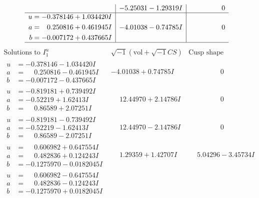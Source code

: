 \documentclass[1p]{elsarticle_modified}
\theoremstyle{definition}
\newcommand{\I}{\sqrt{-1}}
\begin{document}
$$\begin{array}{c|c|c}
 & -5.25031 - 1.29319 I & \phantom{-0.000000 } 0 \\ \hline\begin{aligned}
u &= -0.378146 + 1.034420 I \\
a &= \phantom{-}0.250816 + 0.461945 I \\
b &= -0.007172 + 0.437665 I\end{aligned}
 & -4.01038 - 0.74785 I & \phantom{-0.000000 } 0\\
 \hline 
 \end{array}$$\newpage$$\begin{array}{c|c|c}  
\text{Solutions to }I^u_{1}& \I (\text{vol} + \sqrt{-1}CS) & \text{Cusp shape}\\
 \hline 
\begin{aligned}
u &= -0.378146 - 1.034420 I \\
a &= \phantom{-}0.250816 - 0.461945 I \\
b &= -0.007172 - 0.437665 I\end{aligned}
 & -4.01038 + 0.74785 I & \phantom{-0.000000 } 0 \\ \hline\begin{aligned}
u &= -0.819181 + 0.739492 I \\
a &= -0.52219 + 1.62413 I \\
b &= \phantom{-}0.86589 + 2.07251 I\end{aligned}
 & \phantom{-}12.44970 + 2.14786 I & \phantom{-0.000000 } 0 \\ \hline\begin{aligned}
u &= -0.819181 - 0.739492 I \\
a &= -0.52219 - 1.62413 I \\
b &= \phantom{-}0.86589 - 2.07251 I\end{aligned}
 & \phantom{-}12.44970 - 2.14786 I & \phantom{-0.000000 } 0 \\ \hline\begin{aligned}
u &= \phantom{-}0.606982 + 0.647554 I \\
a &= \phantom{-}0.482836 + 0.124243 I \\
b &= -0.1275970 - 0.0182045 I\end{aligned}
 & \phantom{-}1.29359 + 1.42707 I & \phantom{-}5.04296 - 3.45734 I \\ \hline\begin{aligned}
u &= \phantom{-}0.606982 - 0.647554 I \\
a &= \phantom{-}0.482836 - 0.124243 I \\
b &= -0.1275970 + 0.0182045 I\end{aligned}

\end{array}$$
\end{document}
